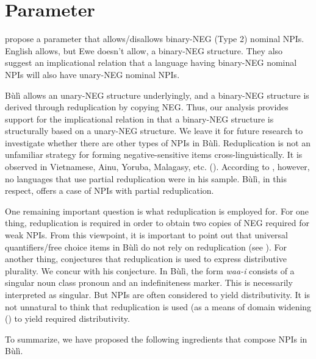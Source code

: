 \documentclass[output=paper,colorlinks,citecolor=brown]{langscibook}
\begin{document}
\z


\section{Parameter}

\cite{CollinsEtAl2017} propose a parameter that allows/disallows binary-NEG (Type 2) nominal NPIs. English allows, but Ewe doesn't allow, a binary-NEG structure. They also suggest an implicational relation that a language having binary-NEG nominal NPIs will also have unary-NEG nominal NPIs.

 Bùlì allows an unary-NEG structure underlyingly, and a binary-NEG structure is derived through reduplication by copying NEG. Thus, our analysis provides support for the implicational relation in that a binary-NEG structure is structurally based on a unary-NEG structure. We leave it for future research to investigate whether there are other types of NPIs in Bùlì.
Reduplication is not an unfamiliar strategy for forming negative-sensitive items cross-linguistically. It is observed in Vietnamese, Ainu, Yoruba, Malagasy, etc. (\citealt{Haspelmath1997}). According to \cite[179]{Haspelmath1997}, however, no languages that use partial reduplication were in his sample. Bùlì, in this respect, offers a case of NPIs with partial reduplication.

One remaining important question is what reduplication is employed for.  For one thing, reduplication is required in order to obtain two copies of NEG required for weak NPIs. From this viewpoint, it is important to point out that universal quantifiers/free choice items in Bùlì do not rely on reduplication (see ). For another thing, \cite{Haspelmath1997} conjectures that reduplication is used to express distributive plurality. We concur with his conjecture. In Bùlì, the form \textit{waa-i} consists of a singular noun class pronoun and an indefiniteness marker. This is necessarily interpreted as singular. But NPIs are often considered to yield distributivity. It is not unnatural to think that reduplication is used (as a means of domain widening (\citealt{KadmonLandman1993}) to yield required distributivity.

To summarize, we have proposed the following ingredients that compose NPIs in Bùlì.
\end{document}
